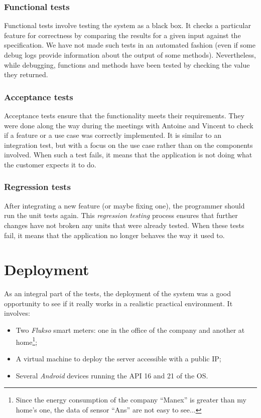 \documentclass[a4paper, oneside, 11pt]{book}
\begin{document}
\subsection{Functional tests}
Functional tests involve testing the system as a black box. It checks a particular feature for correctness by comparing the results for a given input against the specification. We  have not made such tests in an automated fashion (even if some debug logs provide information about the output of some methods). Nevertheless, while debugging, functions and methods have been tested by checking the value they returned. 

\subsection{Acceptance tests}
Acceptance tests ensure that the functionality meets their requirements. They were done along the way during the meetings with Antoine and Vincent to check if a feature or a use case was correctly implemented. It is similar to an integration test, but with a focus on the use case rather than on the components involved. When such a test fails, it means that the application is not doing what the customer expects it to do.  

\subsection{Regression tests}
After integrating a new feature (or maybe fixing one), the programmer should run the unit tests again. This \emph{regression testing} process ensures that further changes have not broken any units that were already tested. When these tests fail, it means that the application no longer behaves the way it used to.

\chapter{Deployment}
As an integral part of the tests, the deployment of the system was a good opportunity to see if it really works in a realistic practical environment. It involves:
\begin{itemize}
	\item Two \textit{Flukso} smart meters: one in the office of the company and another at home\footnote{Since the energy consumption of the company “Manex” is greater than my home's one, the data of sensor “Ans” are not easy to see...};
	\item A virtual machine to deploy the server accessible with a public IP;
	\item Several \textit{Android} devices running the API 16 and 21 of the OS.
\end{itemize}		
\end{document}
